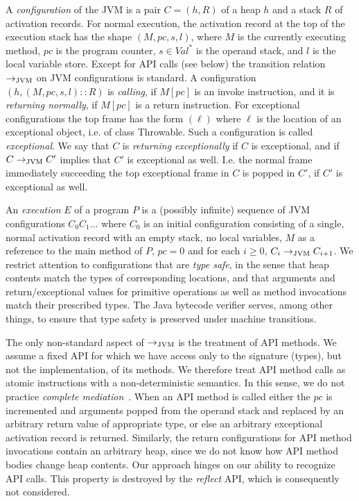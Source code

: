 \documentclass[10pt,twocolumn]{article}
\newcommand{\Val}{\mathit{Val}}
\newcommand{\PC}{\mathit{pc}}
\newcommand{\transJVM}{\rightarrow_{\mbox{\scriptsize{JVM}}}}
\begin{document}
A \emph{configuration} of the JVM is a pair $C= (h, R)$ of a heap $h$ and a stack $R$ of activation records. For normal execution, the activation record at the top of the execution stack has the shape $(M,\PC, s, l)$, where $M$ is the currently executing method, $\PC$ is the program counter, $s\in\Val^*$ is the operand stack, and $l$ is the local variable store. Except for API calls (see below) the transition relation $\transJVM$ on JVM configurations is standard. A configuration $(h, (M,\PC,s,l)::R)$ is {\em calling}, if $M[\PC]$ is an invoke instruction, and it is {\em returning normally}, if $M[\PC]$ is a return instruction. For exceptional configurations the top frame has the form $(\ell)$ where $\ell$ is the location of an exceptional object, i.e. of class Throwable. Such a configuration is called {\em exceptional}. We say that $C$ is {\em returning exceptionally} if $C$ is exceptional, and if $C\transJVM C'$ implies that $C'$ is exceptional as well. I.e. the normal frame immediately succeeding the top exceptional frame in $C$ is popped in $C'$, if $C'$ is exceptional as well.

An \emph{execution} $E$ of a program $P$ is a (possibly infinite) sequence of JVM configurations $C_0 C_1 \ldots$ where $C_0$ is an initial configuration consisting of a single, normal activation record with an empty stack, no local variables, $M$ as a reference to the main method of $P$, $\PC=0$ and for each $i\geq 0$, $C_i \transJVM C_{i+1}$. We restrict attention to configurations that are \emph{type safe}, in the sense that heap contents match the types of corresponding locations, and that arguments and return/exceptional values for primitive operations as well as method invocations match their prescribed types. The Java bytecode verifier serves, among other things, to ensure that type safety is preserved under machine transitions.

The only non-standard aspect of $\transJVM$ is the treatment of API methods. We assume a fixed API for which we have access only to the signature (types), but not the implementation, of its methods. We therefore treat API method calls as atomic instructions with a non-deterministic semantics. In this sense, we do not practice \emph{complete mediation}~\cite{saltzer75}. When an API method is called either the $\PC$ is incremented and arguments popped from the operand stack and replaced by an arbitrary return value of appropriate type, or else an arbitrary exceptional activation record is returned. Similarly, 
the return configurations for API method invocations contain an arbitrary heap, since we do not know how API method bodies change heap contents. Our approach hinges on our ability to recognize API calls. This property is destroyed by the \emph{reflect} API, which is consequently not considered.
\end{document}
